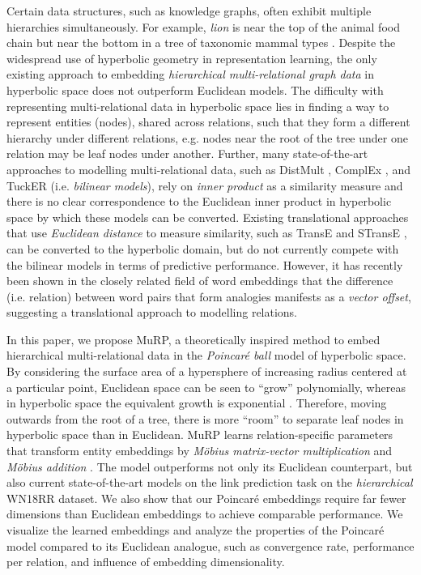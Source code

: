 \documentclass{article}
\begin{document}
 Certain data structures, such as knowledge graphs, often exhibit multiple hierarchies simultaneously. For example, \textit{lion} is near the top of the animal food chain but near the bottom in a tree of taxonomic mammal types \cite{miller1995wordnet}. Despite the widespread use of hyperbolic geometry in representation learning, the only existing approach to embedding \textit{hierarchical multi-relational graph data} in hyperbolic space \cite{suzuki2019riemannian} does not outperform Euclidean models. The difficulty with representing multi-relational data in hyperbolic space lies in finding a way to represent entities (nodes), shared across relations, such that they form a different hierarchy under different relations, e.g. nodes near the root of the tree under one relation may be leaf nodes under another. Further, many state-of-the-art approaches to modelling multi-relational data, such as DistMult \cite{yang2014embedding}, ComplEx \cite{trouillon2016complex}, and TuckER \cite{balazevic2019tucker} (i.e. \textit{bilinear models}), rely on \textit{inner product} as a similarity measure and there is no clear correspondence to the Euclidean inner product in hyperbolic space \cite{tifrea2019poincare} by which these models can be converted. Existing translational approaches that use \textit{Euclidean distance} to measure similarity, such as TransE \cite{bordes2013translating} and STransE \cite{nguyen2016stranse}, can be converted to the hyperbolic domain, but do not currently compete with the bilinear models in terms of predictive performance. However, it has recently been shown in the closely related field of word embeddings \cite{allen2019analogies} that the difference (i.e. relation) between word pairs that form analogies manifests as a \textit{vector offset}, suggesting a translational approach to modelling relations.

In this paper, we propose MuRP, a theoretically inspired method to embed hierarchical multi-relational data in the \textit{Poincar{\'e} ball} model of hyperbolic space. By considering the surface area of a hypersphere of increasing radius centered at a particular point, Euclidean space can be seen to ``grow'' polynomially, whereas in hyperbolic space the equivalent growth is exponential \cite{de2018representation}. Therefore, moving outwards from the root of a tree, there is more ``room'' to separate leaf nodes in hyperbolic space than in Euclidean. MuRP learns relation-specific parameters that transform entity embeddings by \textit{Möbius matrix-vector multiplication} and \textit{Möbius addition} \cite{ungar2001hyperbolic}. The model outperforms not only its Euclidean counterpart, but also current state-of-the-art models on the link prediction task on the \textit{hierarchical} WN18RR dataset. We also show that our Poincar{\'e} embeddings require far fewer dimensions than Euclidean embeddings to achieve comparable performance. We visualize the learned embeddings and analyze the properties of the Poincar{\'e} model compared to its Euclidean analogue, such as convergence rate, performance per relation, and influence of embedding dimensionality.
\end{document}
